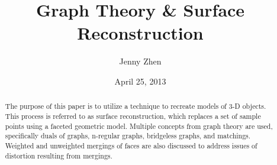 \documentclass[12pt]{article}
\begin{document}
\title{Graph Theory \& Surface Reconstruction}
\author{Jenny Zhen}
\date{April 25, 2013}
\maketitle

\begin{abstract}The purpose of this paper is to utilize a technique to recreate models of 3-D objects. This process is referred to as surface reconstruction, which replaces a set of sample points using a faceted geometric model. Multiple concepts from graph theory are used, specifically duals of graphs, n-regular graphs, bridgeless graphs, and matchings. Weighted and unweighted mergings of faces are also discussed to address issues of distortion resulting from mergings.
\end{abstract}
\end{document}
